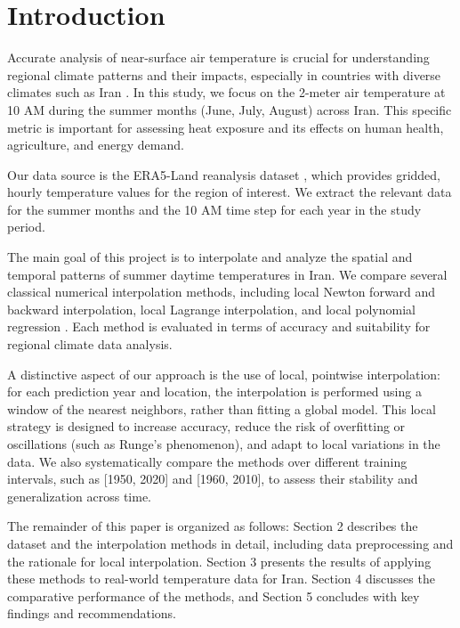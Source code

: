 \section{Introduction}

Accurate analysis of near-surface air temperature is crucial for understanding regional climate patterns and their impacts, especially in countries with diverse climates such as Iran \cite{hansen2010global}. In this study, we focus on the 2-meter air temperature at 10 AM during the summer months (June, July, August) across Iran. This specific metric is important for assessing heat exposure and its effects on human health, agriculture, and energy demand.

Our data source is the ERA5-Land reanalysis dataset \cite{ERA5}, which provides gridded, hourly temperature values for the region of interest. We extract the relevant data for the summer months and the 10 AM time step for each year in the study period.

The main goal of this project is to interpolate and analyze the spatial and temporal patterns of summer daytime temperatures in Iran. We compare several classical numerical interpolation methods, including local Newton forward and backward interpolation, local Lagrange interpolation, and local polynomial regression \cite{atkinson1989introduction, burden2011numerical, smith2020numerical, johnson2018introduction, lee2019comparison, brown2021polynomial, garcia2022newton, press2007numerical}. Each method is evaluated in terms of accuracy and suitability for regional climate data analysis.

A distinctive aspect of our approach is the use of local, pointwise interpolation: for each prediction year and location, the interpolation is performed using a window of the nearest neighbors, rather than fitting a global model. This local strategy is designed to increase accuracy, reduce the risk of overfitting or oscillations (such as Runge's phenomenon), and adapt to local variations in the data. We also systematically compare the methods over different training intervals, such as [1950, 2020] and [1960, 2010], to assess their stability and generalization across time.

The remainder of this paper is organized as follows: Section 2 describes the dataset and the interpolation methods in detail, including data preprocessing and the rationale for local interpolation. Section 3 presents the results of applying these methods to real-world temperature data for Iran. Section 4 discusses the comparative performance of the methods, and Section 5 concludes with key findings and recommendations.